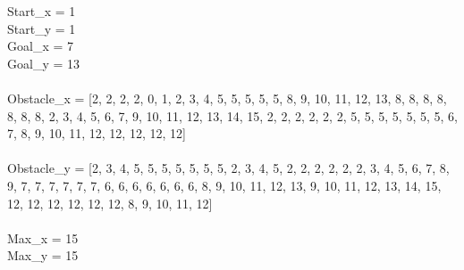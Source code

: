 \documentclass{article}
\begin{document}
\bigskip
\noindent Start\_x = 1 \\
Start\_y = 1 \\
Goal\_x = 7 \\ 
Goal\_y = 13\\ \\
Obstacle\_x = [2, 2, 2, 2, 0, 1, 2, 3, 4, 5, 5, 5, 5, 5, 8, 9, 10, 11, 12, 13, 8, 8, 8, 8, 8, 8, 8, 2, 3, 4, 5, 6, 7,
9, 10, 11, 12, 13, 14, 15, 2, 2, 2, 2, 2, 2, 5, 5, 5, 5, 5, 5, 5, 6, 7, 8, 9, 10, 11, 12, 12, 12, 12, 12] \\ \\
Obstacle\_y = [2, 3, 4, 5, 5, 5, 5, 5, 5, 5, 2, 3, 4, 5, 2, 2, 2, 2, 2, 2, 3, 4, 5, 6, 7, 8, 9, 7, 7, 7, 7, 7, 7, 6, 6, 6,
6, 6, 6, 6, 8, 9, 10, 11, 12, 13, 9, 10, 11, 12, 13, 14, 15, 12, 12, 12, 12, 12, 12, 8, 9, 10, 11, 12] \\ \\
Max\_x = 15 \\
Max\_y = 15 \\ \\
\end{document}
